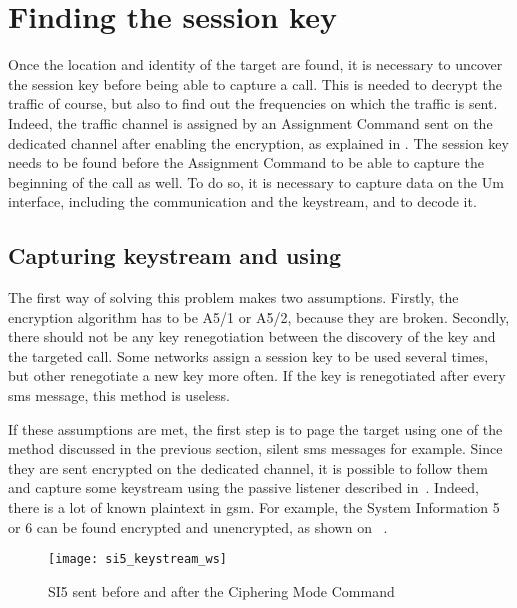    \section{Finding the session key}
    \label{sec:finding_kc}

      Once the location and identity of the target are found, it is
      necessary to uncover the session key before being able to capture
      a call. This is needed to decrypt the traffic of course, but also
      to find out the frequencies on which the traffic is sent. Indeed,
      the traffic channel is assigned by an Assignment Command sent on
      the dedicated channel after enabling the encryption, as explained
      in . The session key needs to be found before
      the Assignment Command to be able to capture the beginning of the
      call as well. To do so, it is necessary to capture data on the Um
      interface, including the communication and the keystream, and to
      decode it.

      \subsection{Capturing keystream and using }

      The first way of solving this problem makes two assumptions.
      Firstly, the encryption algorithm has to be A5/1 or A5/2, because
      they are broken. Secondly, there should not be any key
      renegotiation between the discovery of the key and the targeted
      call. Some networks assign a session key to be used several times,
      but other renegotiate a new key more often. If the key is
      renegotiated after every \gls{sms} message, this method is
      useless.

      If these assumptions are met, the first step is to page the target
      using one of the method discussed in the previous section, silent
      \gls{sms} messages for example. Since they are sent encrypted on
      the dedicated channel, it is possible to follow them and capture
      some keystream using the passive listener described
      in~. Indeed, there is a lot of known
      plaintext in \gls{gsm}. For example, the System Information 5 or 6
      can be found encrypted and unencrypted, as shown on
      ~\cite{nohl_gsm:_2009}.

        \begin{figure}[h]
          \centering
          \texttt{[image: si5\_keystream\_ws]}
          \caption{SI5 sent before and after the Ciphering Mode Command}
          \label{fig:si5_keystream_ws}
        \end{figure}

